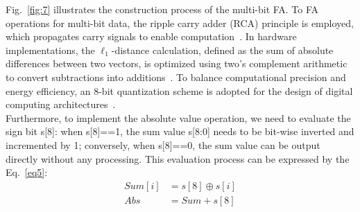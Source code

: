 \documentclass[submit]{elex2024}%
\begin{document}
\noindent
Fig.~\ref{fig:7} illustrates the construction process of the multi-bit FA. To FA operations for multi-bit data, the ripple carry adder (RCA) principle is employed, which propagates carry signals to enable computation~\cite{30}. In hardware implementations, the $\ell_1$-distance calculation, defined as the sum of absolute differences between two vectors, is optimized using two's complement arithmetic to convert subtractions into additions~\cite{31}. To balance computational precision and energy efficiency, an 8-bit quantization scheme is adopted for the design of digital computing architectures~\cite{32}. \\
Furthermore, to implement the absolute value operation, we need to evaluate the sign bit s[8]: when s[8]==1, the sum value s[8:0] needs to be bit-wise inverted and incremented by 1; conversely, when s[8]==0, the sum value can be output directly without any processing. This evaluation process can be expressed by the Eq.~\ref{eq5}:
\begin{equation}
    \begin{aligned}
        Sum[i] &=    s[8]\oplus s[i]\\
        Abs    &=   Sum + s[8]
        \label{eq5}
    \end{aligned}
\end{equation} 
\end{document}
